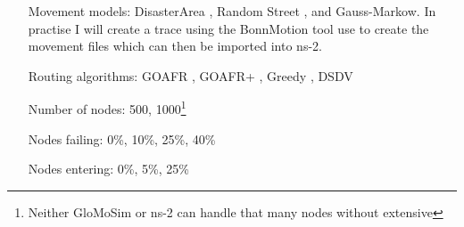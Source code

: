 \begin{itemize}
\item[Movement models:] DisasterArea \cite{disasterArea},  Random Street \cite{randomStreet}, and Gauss-Markow. In practise I will create a trace using the BonnMotion tool \cite{toilers} use to create the movement files which can then be imported into ns-2.
\item[Routing algorithms:] GOAFR \cite{gopher}, GOAFR+ \cite{gopher+}, Greedy \cite{gopher}, DSDV 
\item[Number of nodes:] 500, 1000\footnote{Neither GloMoSim or ns-2 can handle that many nodes without extensive }
\item[Nodes failing:] 0\%, 10\%, 25\%, 40\%
\item[Nodes entering:] 0\%, 5\%, 25\%
\end{itemize}
